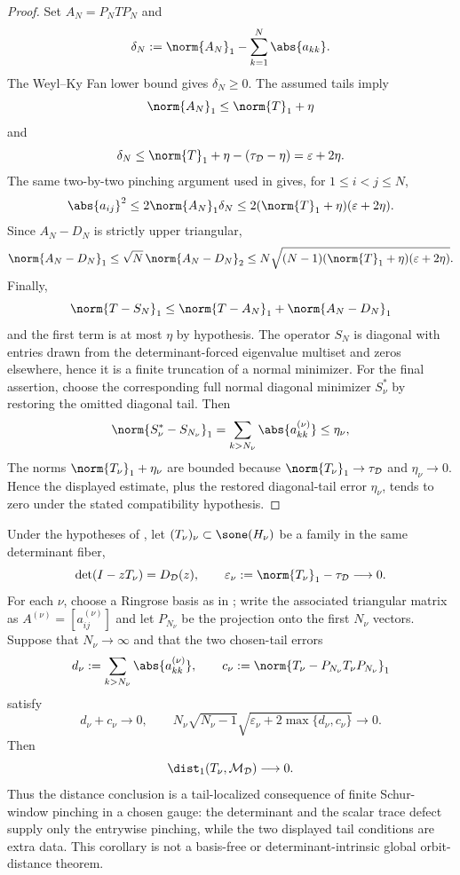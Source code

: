 \begin{proof}
  Set \(A_N=P_NTP_N\) and
  \[
    \delta_N:=\norm{A_N}_1-\sum_{k=1}^N\abs{a_{kk}}.
  \]
  The Weyl--Ky Fan lower bound gives \(\delta_N\ge0\). The assumed tails
  imply
  \[
    \norm{A_N}_1\le\norm{T}_1+\eta
  \]
  and
  \[
    \delta_N
    \le \norm{T}_1+\eta-(\tau_{\mathcal D}-\eta)
    =\varepsilon+2\eta .
  \]
  The same two-by-two pinching argument used in
   gives, for
  \(1\le i<j\le N\),
  \[
    \abs{a_{ij}}^2
    \le2\norm{A_N}_1\delta_N
    \le2(\norm{T}_1+\eta)(\varepsilon+2\eta).
  \]
  Since \(A_N-D_N\) is strictly upper triangular,
  \[
    \norm{A_N-D_N}_1
    \le \sqrt N\,\norm{A_N-D_N}_2
    \le
    N\sqrt{(N-1)(\norm{T}_1+\eta)(\varepsilon+2\eta)}.
  \]
  Finally,
  \[
    \norm{T-S_N}_1
    \le \norm{T-A_N}_1+\norm{A_N-D_N}_1
  \]
  and the first term is at most \(\eta\) by hypothesis. The operator
  \(S_N\) is diagonal with entries drawn from the determinant-forced
  eigenvalue multiset and zeros elsewhere, hence it is a finite truncation
  of a normal minimizer. For the final assertion, choose the corresponding
  full normal diagonal minimizer \(S_\nu^\ast\) by restoring the omitted
  diagonal tail. Then
  \[
    \norm{S_\nu^\ast-S_{N_\nu}}_1
    =\sum_{k>N_\nu}\abs{a_{kk}^{(\nu)}}\le\eta_\nu,
  \]
  The norms \(\norm{T_\nu}_1+\eta_\nu\) are bounded because
  \(\norm{T_\nu}_1\to\tau_{\mathcal D}\) and \(\eta_\nu\to0\). Hence the
  displayed estimate, plus the restored diagonal-tail error
  \(\eta_\nu\), tends to zero under the stated compatibility hypothesis.
\end{proof}

\begin{corollary}
  \label{cor:chosen-tail-stability-criterion}
  Under the hypotheses of
  , let
  \((T_\nu)_\nu\subset\sone(H_\nu)\) be a family in the same determinant
  fiber,
  \[
    \det(I-zT_\nu)=D_{\mathcal D}(z),
    \qquad
    \varepsilon_\nu:=\norm{T_\nu}_1-\tau_{\mathcal D}\longrightarrow0 .
  \]
  For each \(\nu\), choose a Ringrose basis as in
  ; write the associated triangular
  matrix as \(A^{(\nu)}=[a_{ij}^{(\nu)}]\) and let \(P_{N_\nu}\) be the
  projection onto the first \(N_\nu\) vectors. Suppose that
  \(N_\nu\to\infty\) and that the two chosen-tail errors
  \[
    d_\nu:=\sum_{k>N_\nu}\abs{a_{kk}^{(\nu)}} ,
    \qquad
    c_\nu:=\norm{T_\nu-P_{N_\nu}T_\nu P_{N_\nu}}_1
  \]
  satisfy
  \[
    d_\nu+c_\nu\longrightarrow0,
    \qquad
    N_\nu\sqrt{N_\nu-1}
      \sqrt{\varepsilon_\nu+2\max\{d_\nu,c_\nu\}}
    \longrightarrow0 .
  \]
  Then
  \[
    \dist_1(T_\nu,\mathcal M_{\mathcal D})\longrightarrow0 .
  \]
  Thus the distance conclusion is a tail-localized consequence of finite
  Schur-window pinching in a chosen gauge: the determinant and the scalar trace
  defect supply only the entrywise pinching, while the two displayed tail
  conditions are extra data.  This corollary is not a basis-free or
  determinant-intrinsic global orbit-distance theorem.
\end{corollary}

